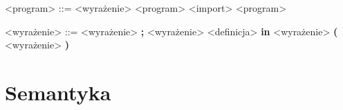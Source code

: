 \documentclass[12pt]{article}
\begin{document}
\begin{grammar}

<program> ::= 
    <wyrażenie>
     <program>
    \alt <import> <program>

<wyrażenie> ::=
    <wyrażenie> \textbf{;} <wyrażenie>
    \alt <definicja> \textbf{in} <wyrażenie>
    \alt \textbf{(} <wyrażenie> \textbf{)}


\end{grammar}

\section{Semantyka}
\end{document}

